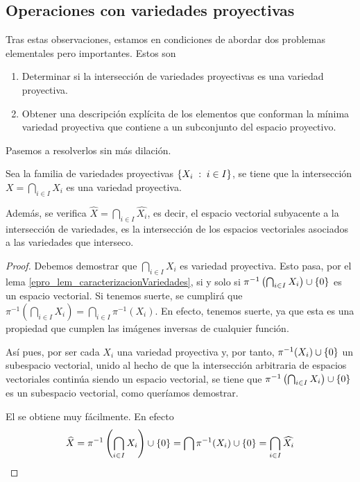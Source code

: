 \subsection{Operaciones con variedades proyectivas}
Tras estas observaciones, estamos en condiciones de abordar dos problemas elementales pero importantes. Estos son
\begin{enumerate}
	\item Determinar si la intersección de variedades proyectivas es una variedad proyectiva.
	\item Obtener una descripción explícita de los elementos que conforman la mínima variedad proyectiva que contiene a un subconjunto del espacio proyectivo.
\end{enumerate}
Pasemos a resolverlos sin más dilación.
\begin{lem}
	\label{epro_lem_interseccionVariedades}
	Sea la familia de variedades proyectivas $\{X_i\;:\; i\in I\}$, se tiene que la intersección $X=\bigcap_{i\in I}X_i$ es una variedad proyectiva.
	
	Además, se verifica $\widehat{X}=\bigcap_{i\in I}\widehat{X_i}$, es decir, el espacio vectorial subyacente a la intersección de variedades, es la intersección de los espacios vectoriales asociados a las variedades que interseco.
\end{lem}
\begin{proof}
	Debemos demostrar que $\bigcap_{i\in I}X_i$ es variedad proyectiva. Esto pasa, por el lema \ref{epro_lem_caracterizacionVariedades}, si y solo si $\pi^{-1}\left(\bigcap_{i\in I}X_i\right)\cup\{0\}$ es un espacio vectorial. Si tenemos suerte, se cumplirá que $\pi^{-1}\left(\bigcap_{i\in I}X_i\right)=\bigcap_{i\in I}\pi^{-1}(X_i)$. En efecto, tenemos suerte, ya que esta es una propiedad que cumplen las imágenes inversas de cualquier función.
	
	Así pues, por ser cada $X_i$ una variedad proyectiva y, por tanto, $\pi^{-1}(X_i)\cup\{0\}$ un subespacio vectorial, unido al hecho de que la intersección arbitraria de espacios vectoriales continúa siendo un espacio vectorial, se tiene que $\pi^{-1}\left(\bigcap_{i\in I}X_i\right)\cup\{0\}$ es un subespacio vectorial, como queríamos demostrar.
	
	El  se obtiene muy fácilmente. En efecto
	\begin{equation*}
		\widehat{X}=\pi^{-1}\left(\bigcap_{i\in I}X_i\right)\cup\{0\}=\bigcap\pi^{-1}(X_i)\cup\{0\}=\bigcap_{i\in I}\widehat{X_i}\qedhere
	\end{equation*}
\end{proof}
